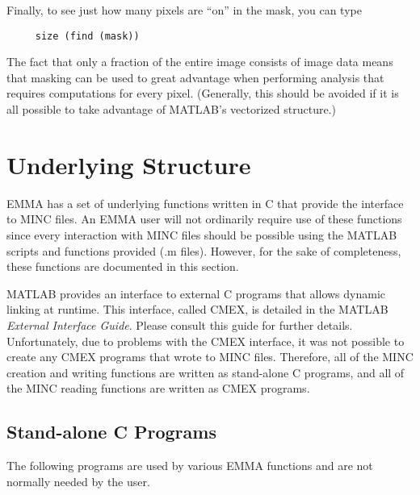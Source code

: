 Finally, to see just how many pixels are ``on'' in the mask, you can type
\begin{verbatim}
     size (find (mask))
\end{verbatim}
The fact that only a fraction of the entire image consists of image
data means that masking can be used to great advantage when
performing analysis that requires computations for every pixel.
(Generally, this should be avoided if it is all possible to take
advantage of MATLAB's vectorized structure.)

\newpage
\section{Underlying Structure}

EMMA has a set of underlying functions written in C that provide the
interface to MINC files.  An EMMA user will not ordinarily require
use of these functions since every interaction with MINC files should
be possible using the MATLAB scripts and functions provided (.m
files).  However, for the sake of completeness, these functions are
documented in this section.

MATLAB provides an interface to external C programs that allows
dynamic linking at runtime.  This interface, called CMEX, is detailed
in the MATLAB {\em External Interface Guide}.  Please consult this
guide for further details.  Unfortunately, due to problems with the
CMEX interface, it was not possible to create any CMEX programs that
wrote to MINC files.  Therefore, all of the MINC creation and writing
functions are written as stand-alone C programs, and all of the MINC
reading functions are written as CMEX programs.


\subsection {Stand-alone C Programs}

The following programs are used by various EMMA functions and are not
normally needed by the user.

